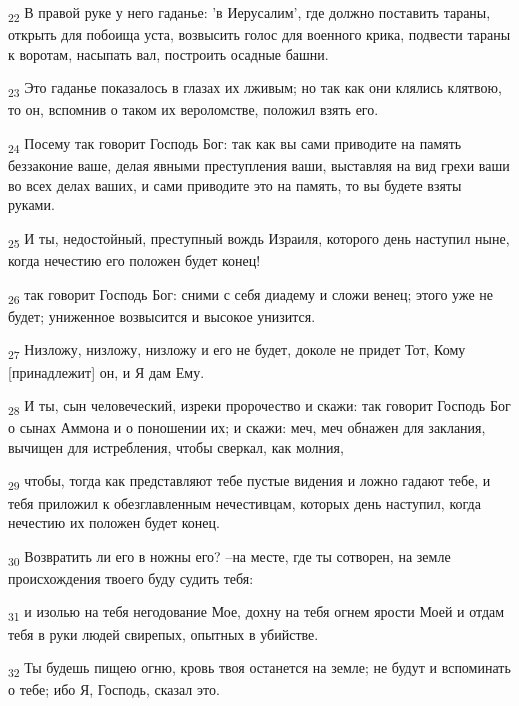 \begin{tcolorbox}
\textsubscript{22} В правой руке у него гаданье: 'в Иерусалим', где должно поставить тараны, открыть для побоища уста, возвысить голос для военного крика, подвести тараны к воротам, насыпать вал, построить осадные башни.
\end{tcolorbox}
\begin{tcolorbox}
\textsubscript{23} Это гаданье показалось в глазах их лживым; но так как они клялись клятвою, то он, вспомнив о таком их вероломстве, положил взять его.
\end{tcolorbox}
\begin{tcolorbox}
\textsubscript{24} Посему так говорит Господь Бог: так как вы сами приводите на память беззаконие ваше, делая явными преступления ваши, выставляя на вид грехи ваши во всех делах ваших, и сами приводите это на память, то вы будете взяты руками.
\end{tcolorbox}
\begin{tcolorbox}
\textsubscript{25} И ты, недостойный, преступный вождь Израиля, которого день наступил ныне, когда нечестию его положен будет конец!
\end{tcolorbox}
\begin{tcolorbox}
\textsubscript{26} так говорит Господь Бог: сними с себя диадему и сложи венец; этого уже не будет; униженное возвысится и высокое унизится.
\end{tcolorbox}
\begin{tcolorbox}
\textsubscript{27} Низложу, низложу, низложу и его не будет, доколе не придет Тот, Кому [принадлежит] он, и Я дам Ему.
\end{tcolorbox}
\begin{tcolorbox}
\textsubscript{28} И ты, сын человеческий, изреки пророчество и скажи: так говорит Господь Бог о сынах Аммона и о поношении их; и скажи: меч, меч обнажен для заклания, вычищен для истребления, чтобы сверкал, как молния,
\end{tcolorbox}
\begin{tcolorbox}
\textsubscript{29} чтобы, тогда как представляют тебе пустые видения и ложно гадают тебе, и тебя приложил к обезглавленным нечестивцам, которых день наступил, когда нечестию их положен будет конец.
\end{tcolorbox}
\begin{tcolorbox}
\textsubscript{30} Возвратить ли его в ножны его? --на месте, где ты сотворен, на земле происхождения твоего буду судить тебя:
\end{tcolorbox}
\begin{tcolorbox}
\textsubscript{31} и изолью на тебя негодование Мое, дохну на тебя огнем ярости Моей и отдам тебя в руки людей свирепых, опытных в убийстве.
\end{tcolorbox}
\begin{tcolorbox}
\textsubscript{32} Ты будешь пищею огню, кровь твоя останется на земле; не будут и вспоминать о тебе; ибо Я, Господь, сказал это.
\end{tcolorbox}
